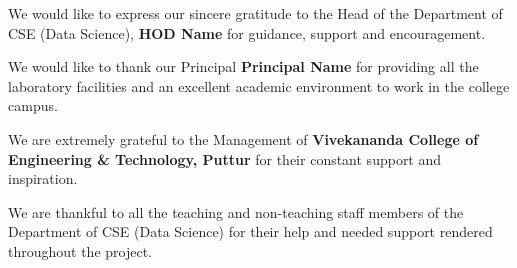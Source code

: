 \documentclass[12pt]{report}
\begin{document}
\vspace{0.3cm}
\noindent We would like to express our sincere gratitude to the Head of the Department of CSE (Data Science), \textbf{\lbrack HOD Name\rbrack} for guidance, support and encouragement.

\vspace{0.3cm}
\noindent We would like to thank our Principal \textbf{\lbrack Principal Name\rbrack} for providing all the laboratory facilities and an excellent academic environment to work in the college campus.

\vspace{0.3cm}
\noindent We are extremely grateful to the Management of \textbf{Vivekananda College of Engineering \& Technology, Puttur} for their constant support and inspiration.

\vspace{0.3cm}
\noindent We are thankful to all the teaching and non-teaching staff members of the Department of CSE (Data Science) for their help and needed support rendered throughout the project.

\newpage
{}
\setcounter{page}{1}

\tableofcontents
\newpage
\listoffigures
\newpage
\listoftables
\newpage
\end{document}
